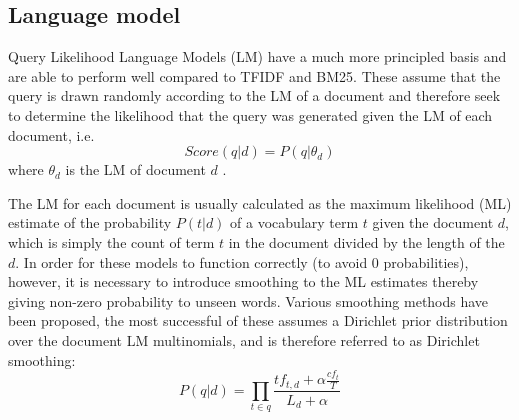 \subsection{Language model}
Query Likelihood Language Models (LM) have a much more principled basis and are able to perform well compared to TFIDF and BM25. These assume that the query is drawn randomly according to the LM of a document and therefore seek to determine the likelihood that the query was generated given the LM of each document, i.e. 
\begin{equation}
Score(q|d) = P(q|\theta_d) 
\end{equation}
where $\theta_d$ is the LM of document $d$ \cite{hiemstra:1999, ponte:1998, crestani:1998}. 

The LM for each document is usually calculated as the maximum likelihood (ML) estimate of the probability $P(t|d)$ of a vocabulary term $t$ given the document $d$, which is simply the count of term $t$ in the document divided by the length of the $d$. In order for these models to function correctly (to avoid 0 probabilities), however, it is necessary to introduce smoothing to the ML estimates \cite{zhai:2004} thereby giving non-zero probability to unseen words. Various smoothing methods have been proposed, the most successful of these assumes a Dirichlet prior distribution over the document LM multinomials, and is therefore referred to as Dirichlet smoothing:
\begin{equation}
P(q|d) = \prod_{t \in q}\frac{tf_{t, d} + \alpha \frac{cf_t}{T}}{L_d + \alpha}
\end{equation}
